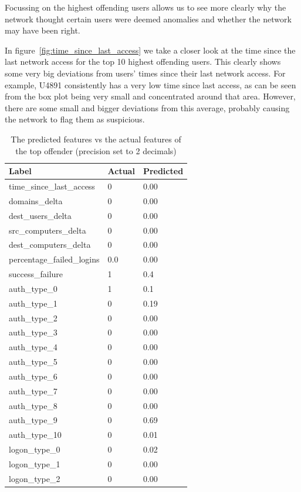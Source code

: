 Focussing on the highest offending users allows us to see more clearly why the network thought certain users were deemed anomalies and whether the network may have been right.

In figure~\ref{fig:time_since_last_access} we take a closer look at the time since the last network access for the top 10 highest offending users. This clearly shows some very big deviations from users' times since their last network access. For example, U4891 consistently has a very low time since last access, as can be seen from the box plot being very small and concentrated around that area. However, there are some small and bigger deviations from this average, probably causing the network to flag them as suspicious.

\begin{table}[htbp]
	\centering
	\caption{The predicted features vs the actual features of the top offender (precision set to 2 decimals)}\label{tab:predicted_vs_actual_top}
	\begin{tabular}{lll}
		Label & Actual & Predicted \\ \midrule
		time\_since\_last\_access & 0 & 0.00 \\
		domains\_delta & 0 & 0.00 \\
		dest\_users\_delta & 0 & 0.00 \\
		src\_computers\_delta & 0 & 0.00 \\
		dest\_computers\_delta & 0 & 0.00 \\
		percentage\_failed\_logins & 0.0 & 0.00 \\
		success\_failure & 1 & 0.4 \\
		auth\_type\_0 & 1 & 0.1 \\
		auth\_type\_1 & 0 & 0.19 \\
		auth\_type\_2 & 0 & 0.00 \\
		auth\_type\_3 & 0 & 0.00 \\
		auth\_type\_4 & 0 & 0.00 \\
		auth\_type\_5 & 0 & 0.00 \\
		auth\_type\_6 & 0 & 0.00 \\
		auth\_type\_7 & 0 & 0.00 \\
		auth\_type\_8 & 0 & 0.00 \\
		auth\_type\_9 & 0 & 0.69 \\
		auth\_type\_10 & 0 & 0.01 \\
		logon\_type\_0 & 0 & 0.02 \\
		logon\_type\_1 & 0 & 0.00 \\
		logon\_type\_2 & 0 & 0.00 \\

\end{tabular}
\end{table}
